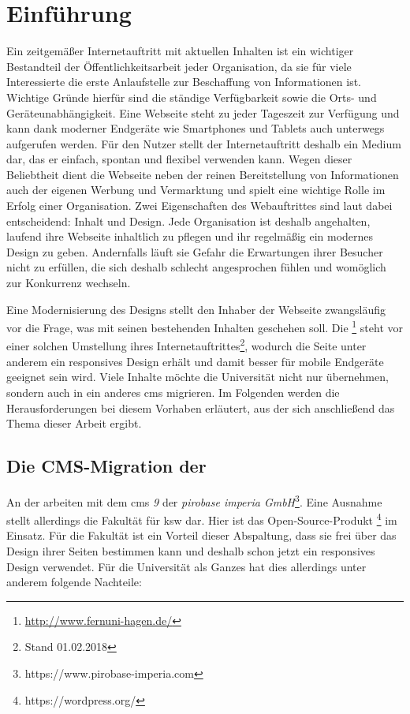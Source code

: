 \chapter{Einführung}
    \label{chapter:introduction}
    Ein zeitgemäßer Internetauftritt mit aktuellen Inhalten
    ist ein wichtiger Bestandteil der Öffentlichkeitsarbeit jeder Organisation,
    da sie für viele Interessierte die erste Anlaufstelle zur Beschaffung von Informationen ist.
    Wichtige Gründe hierfür sind die ständige Verfügbarkeit sowie die Orts-
    und Geräteunabhängigkeit.
    Eine Webseite steht zu jeder Tageszeit zur Verfügung und kann
    dank moderner Endgeräte wie Smartphones und Tablets
    auch unterwegs aufgerufen werden.
    Für den Nutzer stellt der Internetauftritt deshalb ein Medium dar,
    das er einfach, spontan und flexibel verwenden kann.
    Wegen dieser Beliebtheit dient die Webseite neben der reinen Bereitstellung von Informationen
    auch der eigenen Werbung und Vermarktung und spielt eine wichtige Rolle im Erfolg einer Organisation.
    Zwei Eigenschaften des Webauftrittes sind laut \citet{sillence:onlineHealthSites} dabei
    entscheidend: Inhalt und Design.
    Jede Organisation ist deshalb angehalten, laufend ihre Webseite inhaltlich zu pflegen
    und ihr regelmäßig ein modernes Design zu geben.
    Andernfalls läuft sie Gefahr die Erwartungen ihrer Besucher nicht zu erfüllen,
    die sich deshalb schlecht angesprochen fühlen und womöglich zur Konkurrenz wechseln.

    Eine Modernisierung des Designs stellt den Inhaber der Webseite zwangsläufig vor die Frage,
    was mit seinen bestehenden Inhalten geschehen soll.
    Die \fernUni\footnote{\url{http://www.fernuni-hagen.de/}}
    steht vor einer solchen Umstellung ihres Internetauftrittes\footnote{Stand 01.02.2018},
    wodurch die Seite unter anderem ein responsives Design erhält und damit besser für
    mobile Endgeräte geeignet sein wird.
    Viele Inhalte möchte die Universität nicht nur übernehmen,
    sondern auch in ein anderes \gls{cms} migrieren.
    Im Folgenden werden die Herausforderungen bei diesem Vorhaben erläutert,
    aus der sich anschließend das Thema dieser Arbeit ergibt.

    \section{Die CMS-Migration der \fernUni}
        \label{section:fernUniChallenges}
        An der {\fernUni} arbeiten {\editors} mit dem \gls{cms} \textit{{\imperia} 9}
        \cite{fernUni:imperia}
        der \textit{pirobase imperia GmbH}\footnote{https://www.pirobase-imperia.com}.
        Eine Ausnahme stellt allerdings die Fakultät für \gls{ksw} dar.
        Hier ist das Open-Source-Produkt \textit{\wordpress}\footnote{https://wordpress.org/} im Einsatz.
        Für die Fakultät ist ein Vorteil dieser Abspaltung,
        dass sie frei über das Design ihrer Seiten bestimmen kann
        und deshalb schon jetzt ein responsives Design verwendet.
        Für die Universität als Ganzes hat dies allerdings unter anderem folgende Nachteile:

